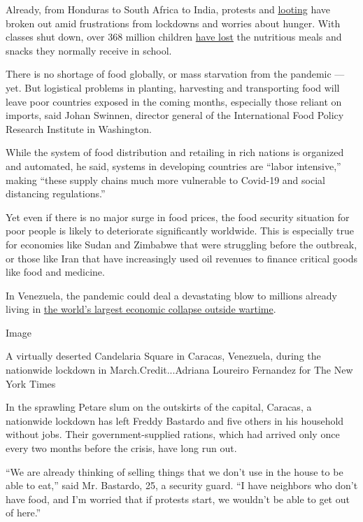 Already, from Honduras to South Africa to India, protests and
\href{https://twitter.com/IOL/status/1252255761951895552?s=20}{looting}
have broken out amid frustrations from lockdowns and worries about
hunger. With classes shut down, over 368 million children
\href{https://cdn.wfp.org/2020/school-feeding-map/index.html}{have lost}
the nutritious meals and snacks they normally receive in school.

There is no shortage of food globally, or mass starvation from the
pandemic --- yet. But logistical problems in planting, harvesting and
transporting food will leave poor countries exposed in the coming
months, especially those reliant on imports, said Johan Swinnen,
director general of the International Food Policy Research Institute in
Washington.

While the system of food distribution and retailing in rich nations is
organized and automated, he said, systems in developing countries are
``labor intensive,'' making ``these supply chains much more vulnerable
to Covid-19 and social distancing regulations.''

Yet even if there is no major surge in food prices, the food security
situation for poor people is likely to deteriorate significantly
worldwide. This is especially true for economies like Sudan and Zimbabwe
that were struggling before the outbreak, or those like Iran that have
increasingly used oil revenues to finance critical goods like food and
medicine.

In Venezuela, the pandemic could deal a devastating blow to millions
already living in
\href{https://www.nytimes.com/2019/05/17/world/americas/venezuela-economy.html}{the
world's largest economic collapse outside wartime}.

Image

A virtually deserted Candelaria Square in Caracas, Venezuela, during the
nationwide lockdown in March.Credit...Adriana Loureiro Fernandez for The
New York Times

In the sprawling Petare slum on the outskirts of the capital, Caracas, a
nationwide lockdown has left Freddy Bastardo and five others in his
household without jobs. Their government-supplied rations, which had
arrived only once every two months before the crisis, have long run out.

``We are already thinking of selling things that we don't use in the
house to be able to eat,'' said Mr. Bastardo, 25, a security guard. ``I
have neighbors who don't have food, and I'm worried that if protests
start, we wouldn't be able to get out of here.''

